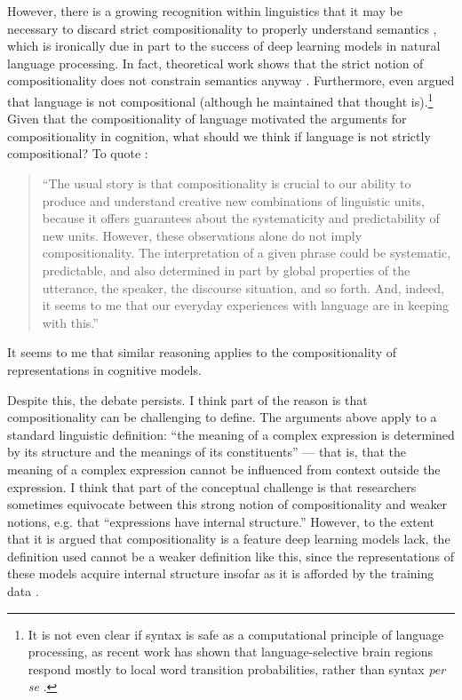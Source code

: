 However, there is a growing recognition within linguistics that it may be necessary to discard strict compositionality to properly understand semantics \citep{Goldberg2015,Potts2019}, which is ironically due in part to the success of deep learning models in natural language processing. In fact, theoretical work shows that the strict notion of compositionality does not constrain semantics anyway \citep{Zadrozny1992}. Furthermore, even \citet{Fodor2001} argued that language is not compositional (although he maintained that thought is).\footnote{It is not even clear if syntax is safe as a computational principle of language processing, as recent work has shown that language-selective brain regions respond mostly to local word transition probabilities, rather than syntax \emph{per se} \citep{Mollica2020}.} Given that the compositionality of language motivated the arguments for compositionality in cognition, what should we think if language is not strictly compositional? To quote \citet{Potts2019}:
\begin{quote}
``The usual story is that compositionality is crucial to our ability to produce and understand creative new combinations of linguistic units, because it offers guarantees about the systematicity and predictability of new units. However, these observations alone do not imply compositionality. The interpretation of a given phrase could be systematic, predictable, and also determined in part by global properties of the utterance, the speaker, the discourse situation, and so forth. And, indeed, it seems to me that our everyday experiences with language are in keeping with this.''
\end{quote}
It seems to me that similar reasoning applies to the compositionality of representations in cognitive models. \par
Despite this, the debate persists. I think part of the reason is that compositionality can be challenging to define. The arguments above apply to a standard linguistic definition: ``the meaning of a complex expression is determined by its structure and the meanings of its constituents'' \citep{sep-compositionality} --- that is, that the meaning of a complex expression cannot be influenced from context outside the expression. I think that part of the conceptual challenge is that researchers sometimes equivocate between  this strong notion of compositionality and weaker notions, e.g. that ``expressions have internal structure.'' However, to the extent that it is argued that compositionality is a feature deep learning models lack, the definition used cannot be a weaker definition like this, since the representations of these models acquire internal structure insofar as it is afforded by the training data \citep[e.g.][]{Mikolov2013}. \par
